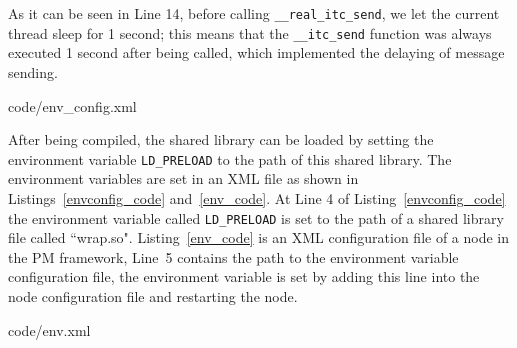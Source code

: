 As it can be seen in Line 14,
before calling \texttt{\_\_real\_itc\_send}, we let the current thread sleep for 1 second; %
this means that the \texttt{\_\_itc\_send} function was always executed 1 second after being called, which implemented the delaying of message sending.

\begin{minipage}{.96\columnwidth}

{code/env_config.xml}
\end{minipage}

After being compiled, the shared library can be loaded by setting the environment variable \texttt{LD\_PRELOAD} to the path of this shared library. %
The environment variables are set in an XML file as shown in Listings~\ref{envconfig_code} and~\ref{env_code}. At Line 4 of Listing~\ref{envconfig_code} the environment variable called \texttt{LD\_PRELOAD} is set to the path of a shared library file called ``wrap.so". Listing~\ref{env_code} is an XML configuration file of a node in the PM framework, Line~5 contains the path to the environment variable configuration file, the environment variable is set by adding this line into the node configuration file and restarting the node.



\begin{minipage}{.96\columnwidth}

{code/env.xml}
\end{minipage}
